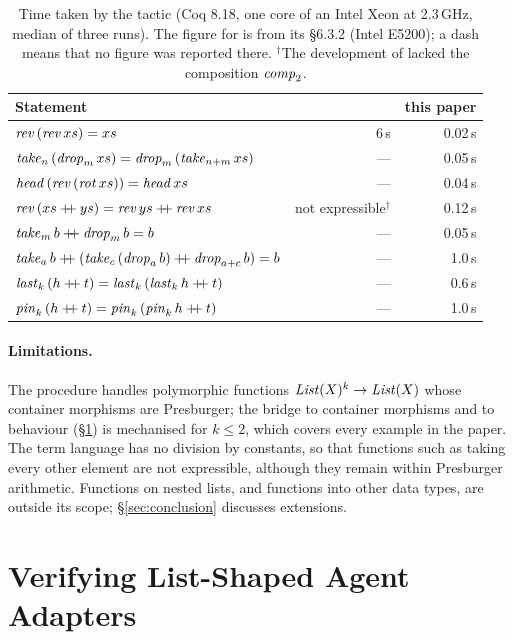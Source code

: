 \documentclass{fundam}
\begin{document}
\begin{table}[t]
  \centering\small
  \caption{Time taken by the tactic  (Coq 8.18, one core of an Intel Xeon
    at 2.3\,GHz, median of three runs).  The figure for \cite{Prince10} is from its
    \S6.3.2 (Intel E5200); a dash means that no figure was reported there.
    $^\dagger$The development of \cite{Prince10} lacked the composition
    $\mathit{comp}_2$.}\label{tab:perf}
  \begin{tabular}{@{}lrr@{}}
    \toprule
    Statement & \cite{Prince10} & this paper \\
    \midrule
    $\mathit{rev}\,(\mathit{rev}\,xs) = xs$  & 6\,s & 0.02\,s \\
    $\mathit{take}_n\,(\mathit{drop}_m\,xs) = \mathit{drop}_m\,(\mathit{take}_{n+m}\,xs)$  & --- & 0.05\,s \\
    $\mathit{head}\,(\mathit{rev}\,(\mathit{rot}\,xs)) = \mathit{head}\,xs$ & --- & 0.04\,s \\
    $\mathit{rev}\,(xs \mathbin{+\!\!+} ys) = \mathit{rev}\,ys \mathbin{+\!\!+} \mathit{rev}\,xs$ & not expressible$^\dagger$  & 0.12\,s \\
    $\mathit{take}_m\,b \mathbin{+\!\!+} \mathit{drop}_m\,b = b$  & --- & 0.05\,s \\
    $\mathit{take}_a\,b \mathbin{+\!\!+} (\mathit{take}_c\,(\mathit{drop}_a\,b) \mathbin{+\!\!+} \mathit{drop}_{a+c}\,b) = b$  & --- & 1.0\,s \\
    $\mathit{last}_k\,(h \mathbin{+\!\!+} t) = \mathit{last}_k\,(\mathit{last}_k\,h \mathbin{+\!\!+} t)$  & --- & 0.6\,s \\
    $\mathit{pin}_k\,(h \mathbin{+\!\!+} t) = \mathit{pin}_k\,(\mathit{pin}_k\,h \mathbin{+\!\!+} t)$  & --- & 1.0\,s \\
    \bottomrule
  \end{tabular}
\end{table}

\paragraph{Limitations.}  The procedure handles polymorphic functions
$\mathit{List}(X)^k \to \mathit{List}(X)$ whose container morphisms are Presburger; the bridge to
container morphisms and to behaviour (\S\ref{sec:agents-verif}) is mechanised for
$k \le 2$, which covers every example in the paper.  The term language has no division
by constants, so that functions such as taking every other element are not expressible,
although they remain within Presburger arithmetic.  Functions on nested lists, and
functions into other data types, are outside its scope; \S\ref{sec:conclusion} discusses
extensions.

\section{Verifying List-Shaped Agent Adapters}\label{sec:agents-verif}
\end{document}
